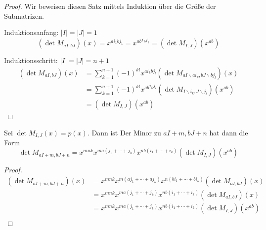 \begin{proof}
    Wir beweisen diesen Satz mittels Induktion über die Größe der Submatrizen. 

    Induktionsanfang: $|I| = |J| = 1$
    \begin{equation*}
        \left( \det{} M_{aI,bJ} \right) (x) = x^{ai_1bj_1} = {x^{ab}}^{i_1j_1} = \left( \det{} M_{I,J} \right) (x^{ab})
    \end{equation*}

    Induktionsschritt: $|I| = |J| = n+1$
    \begin{align*}
        \left( \det{} M_{aI,bJ} \right) (x) &= \sum_{k=1}^{n+1} (-1)^{kl} x^{ai_kbj_l} \left( \det M_{aI\backslash ai_k, bJ \backslash bj_l} \right) (x) \\
                                            &= \sum_{k=1}^{n+1} (-1)^{kl} {x^{ab}}^{i_kj_l} \left( \det M_{I\backslash i_k, J \backslash j_l} \right) (x^{ab}) \\
                                            &= \left( \det{} M_{I,J} \right) (x^{ab})
    \end{align*}
\end{proof}

\begin{korollar}
    Sei $\det{} M_{I,J}(x) = p(x)$. Dann ist 
    Der Minor zu $aI + m,bJ + n$ hat dann die Form
    \begin{equation*}
        \det{} M_{aI + m,bJ + n} = x^{mnk} x^{ma(j_1 +\cdots + j_k)} x^{nb(i_1+\cdots +i_k)} \left( \det{} M_{I,J} \right) (x^{ab})
    \end{equation*}
\end{korollar}

\begin{proof}
    \begin{align*}
        \left( \det{} M_{aI + m,bJ + n} \right) (x) &= x^{mnk} x^{m(aj_1 +\cdots + aj_k)} x^{n(bi_1+\cdots +bi_k)} \left( \det{} M_{aI,bJ} \right) (x) \\
                                                    &= x^{mnk} x^{ma(j_1 +\cdots + j_k)} x^{nb(i_1+\cdots +i_k)} \left( \det{} M_{aI,bJ} \right) (x) \\
                                                    &= x^{mnk} x^{ma(j_1 +\cdots + j_k)} x^{nb(i_1+\cdots +i_k)} \left( \det{} M_{I,J} \right) (x^{ab}) \\
    \end{align*}
\end{proof}